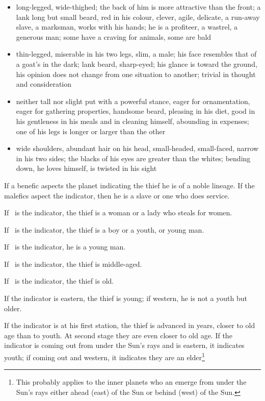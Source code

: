 \begin{itemize}[topsep=0em,itemsep=0em]
\item[\Sagittarius] long-legged, wide-thighed; the back of him is more attractive than the front; a lank long but small beard, red in his colour, clever, agile, delicate, a run-away slave, a marksman, works with his hands; he is a profiteer, a wastrel, a generous man; some have a craving for animals, some are bald
\item[\Capricorn] thin-legged, miserable in his two legs, slim, a male; his face resembles that of a goat's in the dark; lank beard, sharp-eyed; his glance is toward the ground, his opinion does not change from one situation to another; trivial in thought and consideration
\item[\Aquarius] neither tall nor slight put with a powerful stance, eager for ornamentation, eager for gathering properties, handsome beard, pleasing in his diet, good in his gentleness in his meals and in cleaning himself, abounding in expenses; one of his legs is longer or larger than the other
\item[\Pisces] wide shoulders, abundant hair on his head, small-headed, small-faced, narrow in his two sides; the blacks of his eyes are greater than the whites; bending down, he loves himself, is twisted in his sight
\end{itemize}

If a benefic aspects the planet indicating the thief he is of a noble lineage. If the malefics aspect the indicator, then he is a slave or one who does service.

If \Venus\, is the indicator, the thief is a woman or a lady who steals for women.

If \Mercury\, is the indicator, the thief is a boy or a youth, or young man.

If \Mars\, is the indicator, he is a young man.

If \Jupiter\, is the indicator, the thief is middle-aged.

If \Saturn\, is the indicator, the thief is old.

If the indicator is eastern, the thief is young; if western, he is not a youth but older.

If the indicator is at his first station, the thief is advanced in years, closer to old age than to youth. At second stage they are even closer to old age. If the indicator is coming out from under the Sun's rays and is eastern, it indicates youth; if coming out and western, it indicates they are an elder\footnote{This probably applies to the inner planets who an emerge from under the Sun's rays either ahead (east) of the Sun or behind (west) of the Sun.}

